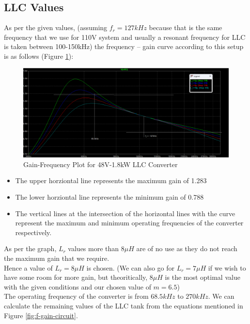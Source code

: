 \subsection{LLC Values}
As per the given values, (assuming $f_r = 127kHz$ because that is the same frequency that we use for 110V system and usually a resonant frequency for LLC is taken between 100-150kHz) the frequency – gain curve according to this setup is as follows (Figure \ref*{fig:image4}):
\begin{figure}[H]
    \centering
    \includegraphics[width=\textwidth]{images/image4.png}
    \caption{Gain-Frequency Plot for 48V-1.8kW LLC Converter}
    \label{fig:image4}
\end{figure}
\begin{itemize}
    \item The upper horziontal line represents the maximum gain of 1.283
    \item The lower horziontal line represents the minimum gain of 0.788
    \item The vertical lines at the intersection of the horizontal lines with the curve represent the maximum and minimum operating frequencies of the converter respectively.
\end{itemize}
As per the graph, $L_r$ values more than $8\mu H$ are of no use as they do not reach the maximum gain that we require.\\
Hence a value of $L_r = 8\mu H$ is chosen. (We can also go for $L_r = 7\mu H$ if we wish to have some room for more gain, but theoritically, $8\mu H$ is the most optimal value with the given conditions and our chosen value of $m = 6.5$)\\
The operating frequency of the converter is from $68.5kHz$ to $270kHz$.
We can calculate the remaining values of the LLC tank from the equations mentioned in Figure \ref*{fig:f-gain-circuit}.